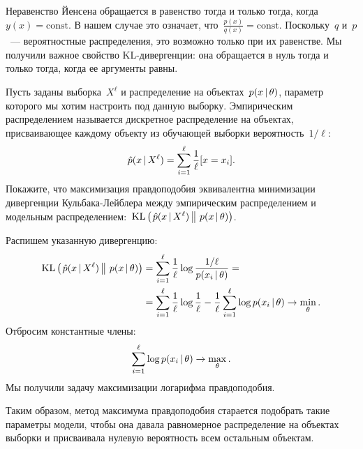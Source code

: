 \documentclass[12pt,fleqn]{article}
\begin{document}
Неравенство Йенсена обращается в равенство тогда и только тогда,
когда~$y(x) = \text{const}$.
В нашем случае это означает, что~$\frac{p(x)}{q(x)} = \text{const}$.
Поскольку~$q$ и~$p$~--- вероятностные распределения, это возможно только
при их равенстве.
Мы получили важное свойство KL-дивергенции:
она обращается в нуль тогда и только тогда,
когда ее аргументы равны.

\begin{vkProblem}
    Пусть заданы выборка~$X^\ell$ и распределение на объектах~$p(x \mspace{3mu}{|}\mspace{3mu} \theta)$,
    параметр которого мы хотим настроить под данную выборку.
    Эмпирическим распределением называется дискретное распределение на объектах,
    присваивающее каждому объекту из обучающей выборки вероятность~$1/\ell$:
    \[
        \hat p(x \mspace{3mu}{|}\mspace{3mu} X^\ell)
        =
        \sum_{i = 1}^{\ell}
            \frac{1}{\ell} [x = x_i].
    \]
    Покажите, что максимизация правдоподобия эквивалентна
    минимизации дивергенции Кульбака-Лейблера между эмпирическим
    распределением и
    модельным распределением:~$\text{KL} \left(\left. {\hat p(x \mspace{3mu}{|}\mspace{3mu} X^\ell)} \mspace{3mu} \right\| \mspace{3mu} {p(x \mspace{3mu}{|}\mspace{3mu}\theta)} \right)$.
\end{vkProblem}

\begin{esSolution}
    Распишем указанную дивергенцию:
    \begin{align*}
        \text{KL} \left(\left. {
            \hat p(x \mspace{3mu}{|}\mspace{3mu} X^\ell)
        } \mspace{3mu} \right\| \mspace{3mu} {
            p(x \mspace{3mu}{|}\mspace{3mu}\theta)
        } \right)
        &=
        \sum_{i = 1}^{\ell}
            \frac{1}{\ell}
            \log \frac{
                1/\ell
            }{
                p(x_i \mspace{3mu}{|}\mspace{3mu} \theta)
            }
        =\\
        &=
        \sum_{i = 1}^{\ell}
            \frac{1}{\ell}
            \log \frac{1}{\ell}
        -
        \frac{1}{\ell}
        \sum_{i = 1}^{\ell}
            \log p(x_i \mspace{3mu}{|}\mspace{3mu} \theta)
        \to \min_\theta.
    \end{align*}
    Отбросим константные члены:
    \[
        \sum_{i = 1}^{\ell}
            \log p(x_i \mspace{3mu}{|}\mspace{3mu} \theta)
        \to \max_\theta.
    \]
    Мы получили задачу максимизации логарифма правдоподобия.
\end{esSolution}

Таким образом, метод максимума правдоподобия старается
подобрать такие параметры модели, чтобы она давала равномерное
распределение на объектах выборки и присваивала нулевую вероятность
всем остальным объектам.
\end{document}
